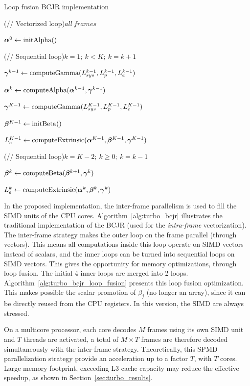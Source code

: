 \begin{algorithm}
  \caption{Loop fusion BCJR implementation}
  \label{alg:turbo_bcjr_loop_fusion}

  \For(// Vectorized loop){$all~frames$}
  {
    $\boldsymbol{\alpha}^0\gets \operatorname*{initAlpha}()$

    \For(// Sequential loop){$k=1;~k<K;~k=k+1$}
    {
      $\boldsymbol{\gamma}^{k-1}\gets \operatorname*{computeGamma}(L_{sys}^{k-1}, L_{p}^{k-1}, L_{e}^{k-1})$

      $\boldsymbol{\alpha}^k\gets \operatorname*{computeAlpha}(\boldsymbol{\alpha}^{k-1}, \boldsymbol{\gamma}^{k-1})$
    }

    $\boldsymbol{\gamma}^{K-1}\gets \operatorname*{computeGamma}(L_{sys}^{K-1}, L_{p}^{K-1}, L_{e}^{K-1})$

    $\boldsymbol{\beta}^{K-1}\gets \operatorname*{initBeta}()$

    $L_e^{K-1}\gets \operatorname*{computeExtrinsic}(\boldsymbol{\alpha}^{K-1}, \boldsymbol{\beta}^{K-1}, \boldsymbol{\gamma}^{K-1})$

    \For(// Sequential loop){$k=K-2;~k \geq 0;~k=k-1$}
    {
      $\boldsymbol{\beta}^k\gets \operatorname*{computeBeta}(\boldsymbol{\beta}^{k+1}, \boldsymbol{\gamma}^{k})$

      $L_e^{k}\gets \operatorname*{computeExtrinsic}(\boldsymbol{\alpha}^{k}, \boldsymbol{\beta}^k, \boldsymbol{\gamma}^{k})$
    }
  }
\end{algorithm}

In the proposed implementation, the inter-frame parallelism is used to fill the
SIMD units of the CPU cores. Algorithm~\ref{alg:turbo_bcjr} illustrates the
traditional implementation of the BCJR (used for the \emph{intra-frame}
vectorization). The inter-frame strategy makes the outer loop on the frame
parallel (through vectors). This means all computations inside this loop operate
on SIMD vectors instead of scalars, and the inner loops can be turned into
sequential loops on SIMD vectors. This gives the opportunity for memory
optimizations, through loop fusion. The initial 4 inner loops are merged into 2
loops. Algorithm~\ref{alg:turbo_bcjr_loop_fusion} presents this loop fusion
optimization. This makes possible the scalar promotion of $\beta_j$ (no longer
an array), since it can be directly reused from the CPU registers. In this
version, the SIMD are always stressed.

On a multicore processor, each core decodes $M$ frames using its own SIMD unit
and $T$ threads are activated, a total of $M\times T$ frames are therefore
decoded simultaneously with the inter-frame strategy. Theoretically, this SPMD
parallelization strategy provide an acceleration up to a factor $T$, with $T$
cores. Large memory footprint, exceeding L3 cache capacity may reduce the
effective speedup, as shown in Section~\ref{sec:turbo_results}.

